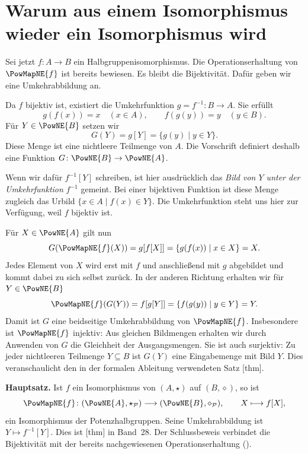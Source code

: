 \clearpage
\section*{Warum aus einem Isomorphismus wieder ein Isomorphismus wird}
\hypertarget{power-isomorphisms.reading.isomorphism}{}

Sei jetzt \(f\colon A\to B\) ein Halbgruppenisomorphismus. Die
Operationserhaltung von \(\PowMapNE{f}\) ist bereits bewiesen.
Es bleibt die Bijektivität. Dafür geben wir eine Umkehrabbildung an.

Da \(f\) bijektiv ist, existiert die Umkehrfunktion
\(g=f^{-1}\colon B\to A\). Sie erfüllt
\[
  g(f(x))=x\quad(x\in A),
  \qquad f(g(y))=y\quad(y\in B).
\]
Für \(Y\in\PowNE{B}\) setzen wir
\[
  G(Y)=g[Y]=\{g(y)\mid y\in Y\}.
\]
Diese Menge ist eine nichtleere Teilmenge von \(A\). Die Vorschrift
definiert deshalb eine Funktion
\(G\colon\PowNE{B}\to\PowNE{A}\).

Wenn wir dafür \(f^{-1}[Y]\) schreiben, ist hier ausdrücklich das
\emph{Bild von \(Y\) unter der Umkehrfunktion} \(f^{-1}\) gemeint.
Bei einer bijektiven Funktion ist diese Menge zugleich das Urbild
\(\{x\in A\mid f(x)\in Y\}\). Die Umkehrfunktion steht uns hier
zur Verfügung, weil \(f\) bijektiv ist.

Für \(X\in\PowNE{A}\) gilt nun
\[
  G(\PowMapNE{f}(X))
    =g[f[X]]
    =\{g(f(x))\mid x\in X\}
    =X.
\]
Jedes Element von \(X\) wird erst mit \(f\) und anschließend mit
\(g\) abgebildet und kommt dabei zu sich selbst zurück. In der
anderen Richtung erhalten wir für \(Y\in\PowNE{B}\)
\[
  \PowMapNE{f}(G(Y))
    =f[g[Y]]
    =\{f(g(y))\mid y\in Y\}
    =Y.
\]
Damit ist \(G\) eine beidseitige Umkehrabbildung von
\(\PowMapNE{f}\). Insbesondere ist \(\PowMapNE{f}\) injektiv:
Aus gleichen Bildmengen erhalten wir durch Anwenden von \(G\)
die Gleichheit der Ausgangsmengen. Sie ist auch surjektiv:
Zu jeder nichtleeren Teilmenge \(Y\subseteq B\) ist \(G(Y)\)
eine Eingabemenge mit Bild \(Y\). Dies veranschaulicht den in der
formalen Ableitung verwendeten Satz
[thm].

\medskip\noindent\textbf{Hauptsatz.}
Ist \(f\) ein Isomorphismus von \((A,\star)\) auf \((B,\diamond)\),
so ist
\[
  \PowMapNE{f}\colon
  (\PowNE{A},\star_{\mathcal P})
    \longrightarrow(\PowNE{B},\diamond_{\mathcal P}),
  \qquad X\longmapsto f[X],
\]
ein Isomorphismus der Potenzhalbgruppen. Seine Umkehrabbildung ist
\(Y\mapsto f^{-1}[Y]\). Dies ist
[thm] in Band~28.
Der Schlussbeweis verbindet die Bijektivität mit der bereits
nachgewiesenen Operationserhaltung
().

